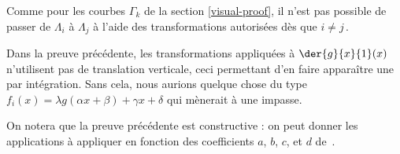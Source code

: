 

Comme pour les courbes $\Gamma_k$ de la section \ref{visual-proof}, il n'est pas possible de passer de $\Lambda_i$  à $\Lambda_j$ à l'aide des transformations autorisées dès que $i \neq j$\,.




\begin{remark}
	Dans la preuve précédente, les transformations appliquées à $\der{g}{x}{1}(x)$ n'utilisent pas de translation verticale, ceci permettant d'en faire apparaître une par intégration.
	Sans cela, nous aurions quelque chose du type $f_i(x) = \lambda g(\alpha x + \beta) + \gamma x + \delta$ qui mènerait à une impasse.
\end{remark}




\begin{remark}
	On notera que la preuve précédente est constructive : on peut donner les applications à appliquer en fonction des coefficients $a$, $b$, $c$, et $d$ de \,.
\end{remark}


